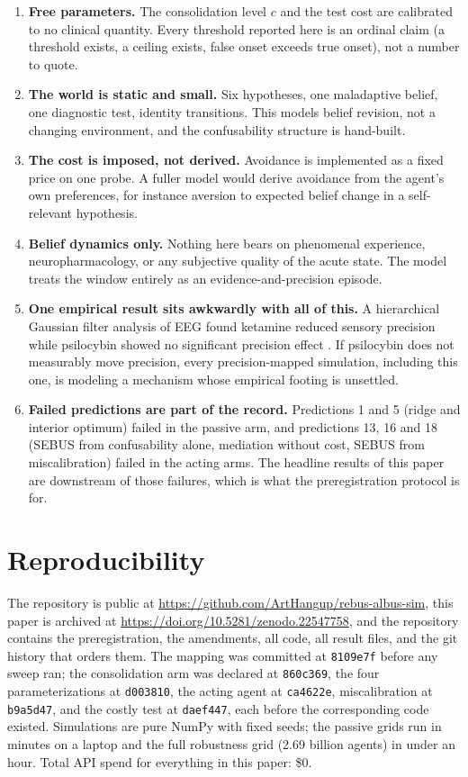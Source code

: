 \documentclass[11pt]{article}
\begin{document}
\begin{enumerate}
  \item \textbf{Free parameters.} The consolidation level $c$ and the test cost are
  calibrated to no clinical quantity. Every threshold reported here is an ordinal
  claim (a threshold exists, a ceiling exists, false onset exceeds true onset), not a
  number to quote.
  \item \textbf{The world is static and small.} Six hypotheses, one maladaptive
  belief, one diagnostic test, identity transitions. This models belief revision,
  not a changing environment, and the confusability structure is hand-built.
  \item \textbf{The cost is imposed, not derived.} Avoidance is implemented as a
  fixed price on one probe. A fuller model would derive avoidance from the agent's
  own preferences, for instance aversion to expected belief change in a
  self-relevant hypothesis.
  \item \textbf{Belief dynamics only.} Nothing here bears on phenomenal experience,
  neuropharmacology, or any subjective quality of the acute state. The model treats
  the window entirely as an evidence-and-precision episode.
  \item \textbf{One empirical result sits awkwardly with all of this.} A
  hierarchical Gaussian filter analysis of EEG found ketamine reduced sensory
  precision while psilocybin showed no significant precision effect
  \cite{allohverdi2025}. If psilocybin does not measurably move precision, every
  precision-mapped simulation, including this one, is modeling a mechanism whose
  empirical footing is unsettled.
  \item \textbf{Failed predictions are part of the record.} Predictions 1 and 5
  (ridge and interior optimum) failed in the passive arm, and predictions 13, 16 and
  18 (SEBUS from confusability alone, mediation without cost, SEBUS from
  miscalibration) failed in the acting arms. The headline results of this paper are
  downstream of those failures, which is what the preregistration protocol is for.
\end{enumerate}

\section{Reproducibility}
\label{sec:repro}

The repository is public at
\url{https://github.com/ArtHangup/rebus-albus-sim}, this paper is archived at
\url{https://doi.org/10.5281/zenodo.22547758}, and the repository contains the
preregistration, the amendments, all code, all result files, and the git history
that orders them. The mapping was committed at
\texttt{8109e7f} before any sweep ran; the consolidation arm was declared at
\texttt{860c369}, the four parameterizations at \texttt{d003810}, the acting agent at
\texttt{ca4622e}, miscalibration at \texttt{b9a5d47}, and the costly test at
\texttt{daef447}, each before the corresponding code existed. Simulations are
pure NumPy with fixed seeds; the passive grids run in minutes on a laptop and the
full robustness grid (2.69 billion agents) in under an hour. Total API spend for
everything in this paper: \$0.
\end{document}
